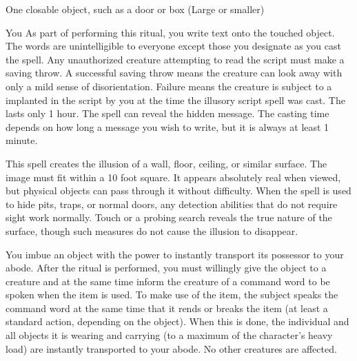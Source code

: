 \begin{spelltarget}{One closable object, such as a door or box (Large or smaller)}
\begin{spelltarget}{You}
\spelleffect As part of performing this ritual, you write text onto the touched object. The words are unintelligible to everyone except those you designate as you cast the spell. Any unauthorized creature attempting to read the script must make a saving throw. A successful saving throw means the creature can look away with only a mild sense of disorientation. Failure means the creature is subject to a  implanted in the script by you at the time the illusory script spell was cast. The  lasts only 1 hour.
\spellnotes The  spell can reveal the hidden message. The casting time depends on how long a message you wish to write, but it is always at least 1 minute.

\spelleffect This spell creates the illusion of a wall, floor, ceiling, or similar surface. The image must fit within a 10 foot square. It appears absolutely real when viewed, but physical objects can pass through it without difficulty. When the spell is used to hide pits, traps, or normal doors, any detection abilities that do not require sight work normally. Touch or a probing search reveals the true nature of the surface, though such measures do not cause the illusion to disappear.

\spelleffect You imbue an object with the power to instantly transport its possessor to your abode. After the ritual is performed, you must willingly give the object to a creature and at the same time inform the creature of a command word to be spoken when the item is used. To make use of the item, the subject speaks the command word at the same time that it rends or breaks the item (at least a standard action, depending on the object). When this is done, the individual and all objects it is wearing and carrying (to a maximum of the character's heavy load) are instantly transported to your abode. No other creatures are affected.


\end{spelltarget}
\end{spelltarget}
